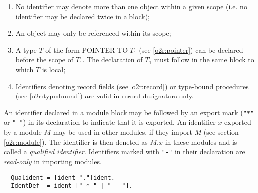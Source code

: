 \begin{enumerate}
\item
    No identifier may denote more than one object within
    a given scope (i.e. no identifier may be declared twice in a block);
\item
    An object may only be referenced within its scope;
\item
    A type $T$ of the form POINTER TO $T_1$ (see \ref{o2r:pointer})
    can be declared before the scope of $T_1$.
    The declaration of $T_1$ must follow in the same block to which
    $T$ is local;
\item
    Identifiers denoting record fields (see \ref{o2r:record})
    or type-bound procedures (see \ref{o2r:type:bound})
    are valid in record designators only.
\end{enumerate}

\noindent
An identifier declared in a module block may be followed by an export
mark (\verb|"*"| or \verb|"-"|) in its declaration to indicate that
it is exported.
An identifier $x$ exported by a module $M$
may be used in other modules,
if they import $M$ (see section \ref{o2r:module}). The identifier
is then denoted as $M.x$ in these modules and is called a {\em qualified
identifier}. Identifiers marked with \verb|"-"| in their declaration
are {\em read-only} in importing modules.
{\BNFsize
\begin{verbatim}
  Qualident = [ident "."]ident.
  IdentDef  = ident [" * " | " - "].
\end{verbatim}}

